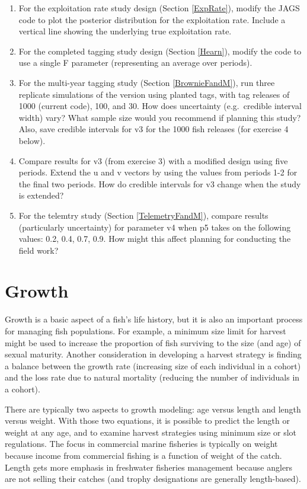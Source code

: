 \documentclass[
]{krantz}
\begin{document}
\begin{enumerate}
\def\labelenumi{\arabic{enumi}.}
\item
  For the exploitation rate study design (Section \ref{ExpRate}), modify the JAGS code to plot the posterior distribution for the exploitation rate. Include a vertical line showing the underlying true exploitation rate.
\item
  For the completed tagging study design (Section \ref{Hearn}), modify the code to use a single F parameter (representing an average over periods).
\item
  For the multi-year tagging study (Section \ref{BrownieFandM}), run three replicate simulations of the version using planted tags, with tag releases of 1000 (current code), 100, and 30. How does uncertainty (e.g.~credible interval width) vary? What sample size would you recommend if planning this study? Also, save credible intervals for v3 for the 1000 fish releases (for exercise 4 below).
\item
  Compare results for v3 (from exercise 3) with a modified design using five periods. Extend the u and v vectors by using the values from periods 1-2 for the final two periods. How do credible intervals for v3 change when the study is extended?
\item
  For the telemtry study (Section \ref{TelemetryFandM}), compare results (particularly uncertainty) for parameter v4 when p5 takes on the following values: 0.2, 0.4, 0.7, 0.9. How might this affect planning for conducting the field work?
\end{enumerate}

\hypertarget{Growth}{%
\chapter{Growth}\label{Growth}}

Growth is a basic aspect of a fish's life history, but it is also an important process for managing fish populations. For example, a minimum size limit for harvest might be used to increase the proportion of fish surviving to the size (and age) of sexual maturity. Another consideration in developing a harvest strategy is finding a balance between the growth rate (increasing size of each individual in a cohort) and the loss rate due to natural mortality (reducing the number of individuals in a cohort).

There are typically two aspects to growth modeling: age versus length and length versus weight. With those two equations, it is possible to predict the length or weight at any age, and to examine harvest strategies using minimum size or slot regulations. The focus in commercial marine fisheries is typically on weight because income from commercial fishing is a function of weight of the catch. Length gets more emphasis in freshwater fisheries management because anglers are not selling their catches (and trophy designations are generally length-based).
\end{document}

